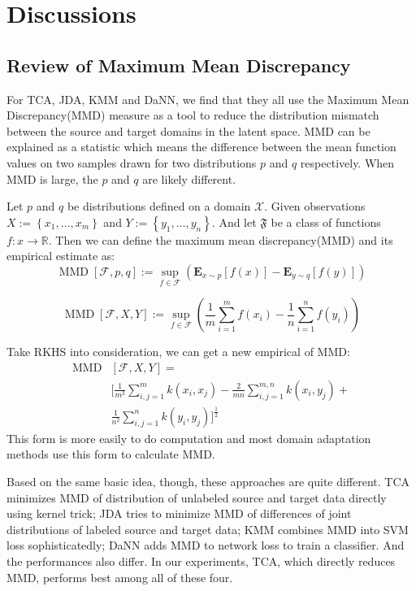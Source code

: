 \documentclass[conference]{IEEEtran}
\begin{document}
\section{Discussions}
\subsection{Review of Maximum Mean Discrepancy}
For TCA, JDA, KMM and DaNN, we find that they all use the Maximum Mean Discrepancy(MMD) measure as a tool to reduce the distribution mismatch between the source and target domains in the latent space. MMD can be explained as a statistic which means the difference between the mean function values on two samples drawn for two distributions $p$ and $q$ respectively. When MMD is large, the $p$ and $q$ are likely different.

Let $p$ and $q$ be distributions defined on a domain $\mathcal{X}$. Given observations $X := \left\{x_{1}, \dots, x_{m}\right\}$ and $Y :=\left\{y_{1}, \dots, y_{n}\right\}$. And let $\mathfrak{F}$ be a class of functions $f : x \rightarrow \mathbb{R}$. Then we can define the maximum mean discrepancy(MMD) and its empirical estimate as:
\begin{equation}
\operatorname{MMD}[\mathcal{F}, p, q] :=\sup _{f \in \mathcal{F}}\left(\mathbf{E}_{x \sim p}[f(x)]-\mathbf{E}_{y \sim q}[f(y)]\right)
\end{equation}

\begin{equation}
\operatorname{MMD}[\mathcal{F}, X, Y] :=\sup _{f \in \mathcal{F}}\left(\frac{1}{m} \sum_{i=1}^{m} f\left(x_{i}\right)-\frac{1}{n} \sum_{i=1}^{n} f\left(y_{i}\right)\right)
\end{equation}

Take RKHS into consideration, we can get a new empirical of MMD:
\begin{equation}
\begin{split}
 \operatorname{MMD} & [\mathcal{F}, X, Y]= \\
& [\frac{1}{m^{2}} \sum_{i, j=1}^{m} k\left(x_{i}, x_{j}\right)-\frac{2}{m n} \sum_{i, j=1}^{m, n} k\left(x_{i}, y_{j}\right)+ \\
& \frac{1}{n^{2}} \sum_{i, j=1}^{n} k\left(y_{i}, y_{j}\right)]^{\frac{1}{2}}
\end{split}
\end{equation}
This form is more easily to do computation and most domain adaptation methods use this form to calculate MMD.

Based on the same basic idea, though, these approaches are quite different. TCA minimizes MMD of distribution of unlabeled source and target data directly using kernel trick; JDA tries to minimize MMD of differences of joint distributions of labeled source and target data; KMM combines MMD into SVM loss sophisticatedly; DaNN adds MMD to network loss to train a classifier. And the performances also differ. In our experiments, TCA, which directly reduces MMD, performs best among all of these four.
\end{document}
